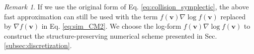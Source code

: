 \documentclass[preprint,1p,times]{elsarticle}
\theoremstyle{definition}
\theoremstyle{remark}
\newtheorem{remark}[theorem]{Remark}
\newcommand{\tcr}[1]{\textcolor{black}{#1}}
\begin{document}
\begin{remark}
If we use the original form of Eq. \eqref{eq:collision_symplectic}, 
the above fast approximation can still be used with the term $f(\boldsymbol{v}) \nabla \log f(\boldsymbol{v})$  replaced by $\nabla f(\boldsymbol{v})$ in Eq. \eqref{eq:sim_CM2}. We choose the log-form $f(\boldsymbol{v}) \nabla \log f(\boldsymbol{v})$ to construct the structure-preserving numerical scheme presented in Sec. \ref{subsec:discretization}.    
\end{remark}




\end{document}
